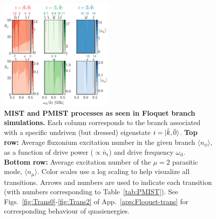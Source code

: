 \documentclass[%
reprint,
superscriptaddress,
 amsmath,amssymb,
 aps,
 prx,
longbibliography,
floatfix,
]{revtex4-2}
\begin{document}
\begin{figure}[!htb]
    \centering
    \includegraphics[width=0.5\textwidth]{Figures/Floquet_min.pdf}
    \caption{{\bf MIST and PMIST processes as seen in Floquet branch simulations.}  
    Each column corresponds to the branch associated with a specific undriven (but dressed) eigenstate $i=\ket{\tilde{k},\tilde{0}}$.  
    \textbf{Top row:} Average fluxonium excitation number in the given branch $\langle n_\phi\rangle $, as a function of drive power ($\propto\bar{n}_\textrm{r}$) and drive frequency $\omega_\textrm{d}$. \textbf{Bottom row:} Average excitation number of the $\mu=2$ parasitic mode, $\langle n_\mu\rangle$. Color scales use a log scaling to help visualize all transitions.  Arrows and numbers are used to indicate each transition (with numbers corresponding to Table~\ref{tab:PMIST}). See Figs.~\ref{fig:Trans0}-\ref{fig:Trans2} of App.~\ref{app:Floquet-trans} for corresponding behaviour of  quasienergies.}
    \label{fig:Floquet}
\end{figure}
\end{document}
